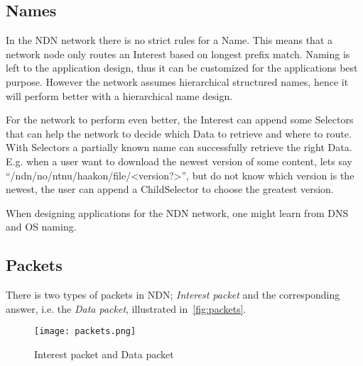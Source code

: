 \subsection{Names}\label{name}
In the \gls{NDN} network there is no strict rules for a Name.
This means that a network node only routes an Interest based on longest prefix match.
Naming is left to the application design, thus it can be customized for the applications best purpose.
However the network assumes hierarchical structured names, hence it will perform better with a hierarchical name design.

For the network to perform even better, the Interest can append some Selectors that can help the network to decide which Data to retrieve and where to route.
With Selectors a partially known name can successfully retrieve the right Data.
E.g. when a user want to download the newest version of some content, lets say ``/ndn/no/ntnu/haakon/file/<version?>'', but do not know which version is the newest, the user can append a ChildSelector to choose the greatest version.

When designing applications for the \gls{NDN} network, one might learn from \gls{DNS} and \gls{OS} naming.

\subsection{Packets}\label{packets}
There is two types of packets in \gls{NDN};
\textit{Interest packet} and the corresponding answer, i.e. the \textit{Data packet}, illustrated in~\autoref{fig:packets}.

\begin{figure}[H]
  \centering
  \texttt{[image: packets.png]}
  \caption{Interest packet and Data packet}
  \label{fig:packets}
\end{figure}

